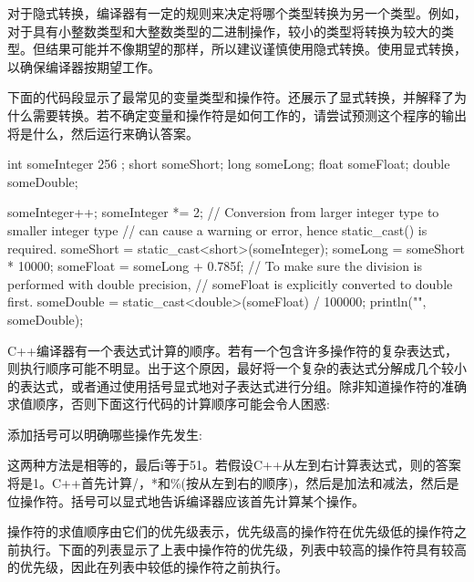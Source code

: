 对于隐式转换，编译器有一定的规则来决定将哪个类型转换为另一个类型。例如，对于具有小整数类型和大整数类型的二进制操作，较小的类型将转换为较大的类型。但结果可能并不像期望的那样，所以建议谨慎使用隐式转换。使用显式转换，以确保编译器按期望工作。

下面的代码段显示了最常见的变量类型和操作符。还展示了显式转换，并解释了为什么需要转换。若不确定变量和操作符是如何工作的，请尝试预测这个程序的输出将是什么，然后运行来确认答案。

\begin{cpp}
int someInteger { 256 };
short someShort;
long someLong;
float someFloat;
double someDouble;

someInteger++;
someInteger *= 2;
// Conversion from larger integer type to smaller integer type
// can cause a warning or error, hence static_cast() is required.
someShort = static_cast<short>(someInteger);
someLong = someShort * 10000;
someFloat = someLong + 0.785f;
// To make sure the division is performed with double precision,
// someFloat is explicitly converted to double first.
someDouble = static_cast<double>(someFloat) / 100000;
println("{}", someDouble);
\end{cpp}

C++编译器有一个表达式计算的顺序。若有一个包含许多操作符的复杂表达式，则执行顺序可能不明显。出于这个原因，最好将一个复杂的表达式分解成几个较小的表达式，或者通过使用括号显式地对子表达式进行分组。除非知道操作符的准确求值顺序，否则下面这行代码的计算顺序可能会令人困惑:


添加括号可以明确哪些操作先发生:


这两种方法是相等的，最后i等于51。若假设C++从左到右计算表达式，则的答案将是1。C++首先计算/，*和\%(按从左到右的顺序)，然后是加法和减法，然后是位操作符。括号可以显式地告诉编译器应该首先计算某个操作。

操作符的求值顺序由它们的优先级表示，优先级高的操作符在优先级低的操作符之前执行。下面的列表显示了上表中操作符的优先级，列表中较高的操作符具有较高的优先级，因此在列表中较低的操作符之前执行。

